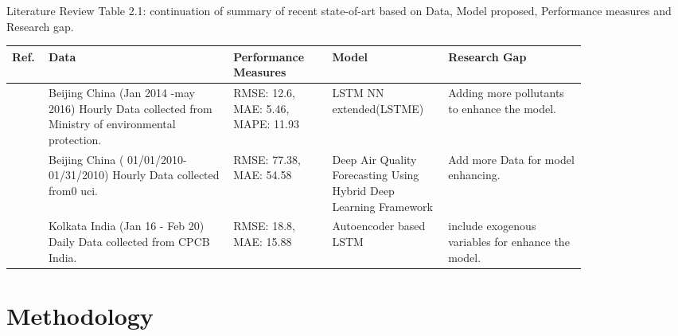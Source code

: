 \documentclass[12pt, aspectratio=169]{beamer}
\begin{document}
\begin{frame}{Literature Review}
	\centering
	\scriptsize {Table 2.1: continuation of summary of recent state-of-art based on Data,  Model proposed,  Performance measures and Research gap.}\\
	\begin{table}
		\centering
		\begin{tabular}{|p{0.03\linewidth}|p{0.29\linewidth}|p{0.15\linewidth}|p{0.16\linewidth}|p{0.21\linewidth}|}
			\hline
			\footnotesize \textbf {Ref.} & \footnotesize \textbf { Data} & \footnotesize \textbf {Performance Measures } & \footnotesize \textbf {Model} & \footnotesize \textbf {Research Gap }  \\ \hline
			\scriptsize  \cite{li2017long}          \scriptsize & Beijing China (Jan 2014 -may   2016) Hourly Data collected from Ministry of environmental protection.    \scriptsize & RMSE: 12.6,  MAE: 5.46,  MAPE:  11.93                                                                        \scriptsize & LSTM NN extended(LSTME)                                             \scriptsize & Adding more pollutants to enhance the model.                                           \\\hline
			\scriptsize \cite{du2019deep}         \scriptsize & Beijing China (   01/01/2010-01/31/2010) Hourly Data collected from0 uci.                                 \scriptsize & RMSE: 77.38,  MAE: 54.58                                                                                   \scriptsize & Deep Air Quality Forecasting   Using Hybrid Deep Learning Framework \scriptsize & Add more Data for model enhancing.\\\hline
			\scriptsize \cite{nath2021long}       \scriptsize & Kolkata India (Jan 16 - Feb 20)  Daily Data collected from CPCB   India.                               \scriptsize & RMSE: 18.8,  MAE: 15.88                                                                                    \scriptsize & Autoencoder based LSTM                                             \scriptsize &  include exogenous variables for enhance the model. \\ \hline
		   \end{tabular}
	\end{table}
\end{frame}






\section[Methodology]{Methodology}
\end{document}

